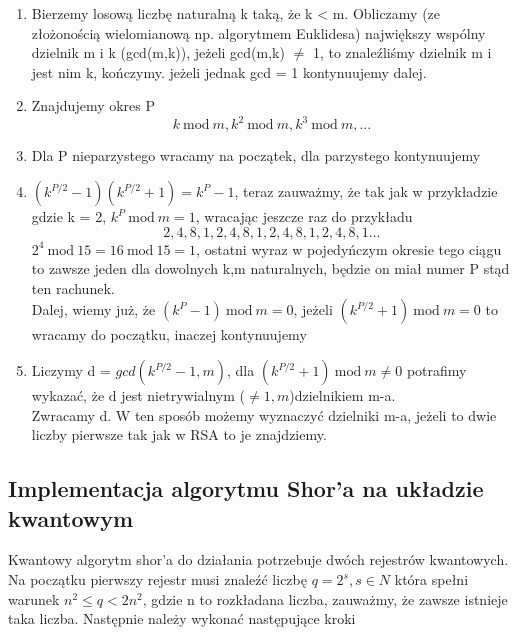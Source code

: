 \documentclass[12pt, letterpaper]{article}
\newcommand{\Mod}[1]{\ \mathrm{mod}\ #1}
\begin{document}
\begin{enumerate}
\item Bierzemy losową liczbę naturalną k taką, że k < m. Obliczamy (ze złożonością wielomianową np. algorytmem Euklidesa) największy wspólny dzielnik m i k (gcd(m,k)), 
jeżeli gcd(m,k) $\ne$ 1, to znaleźliśmy dzielnik m i jest nim k, kończymy. jeżeli jednak gcd = 1 kontynuujemy dalej.

\item Znajdujemy okres P \[ k \Mod{m}, k^2 \Mod{m}, k^3 \Mod{m}, ...\]

\item Dla P nieparzystego wracamy na początek, dla parzystego kontynuujemy

\item $(k^{P/2} - 1)(k^{P/2} + 1) = k^P - 1$, teraz zauważmy, że tak jak w przykładzie gdzie k = 2, $k^P \Mod{m} = 1$, wracając jeszcze raz do przykładu   
\[2, 4, 8, 1, 2, 4, 8, 1, 2, 4, 8, 1, 2, 4, 8, 1 ...\]
$2^4 \Mod{15} = 16 \Mod{15} = 1$, ostatni wyraz w pojedyńczym okresie tego ciągu to zawsze jeden dla dowolnych k,m naturalnych, będzie on miał numer P stąd ten rachunek.\\
Dalej, wiemy już, że $(k^P - 1) \Mod{m} = 0$, jeżeli $(k^{P/2} + 1) \Mod{m} = 0$ to wracamy do początku, inaczej kontynuujemy

\item Liczymy d = $gcd(k^{P/2} - 1, m)$, dla $(k^{P/2} + 1) \Mod{m} \ne 0$ potrafimy wykazać, że d jest nietrywialnym ($\ne 1, m$)dzielnikiem m-a. \\Zwracamy d. W ten sposób możemy wyznaczyć dzielniki m-a, jeżeli to dwie liczby pierwsze tak jak w RSA to je znajdziemy.

\end{enumerate}




















\newpage
\subsection {Implementacja algorytmu Shor'a na układzie kwantowym} 

Kwantowy algorytm shor'a do działania potrzebuje dwóch rejestrów kwantowych. Na początku pierwszy rejestr musi znaleźć liczbę $q = 2^s, s \in N$ która spełni warunek $n^2 \leq q < 2n^2$, gdzie n to rozkładana liczba, zauważmy, że zawsze istnieje taka liczba. Następnie należy wykonać następujące kroki\cite{pdf}
\end{document}
